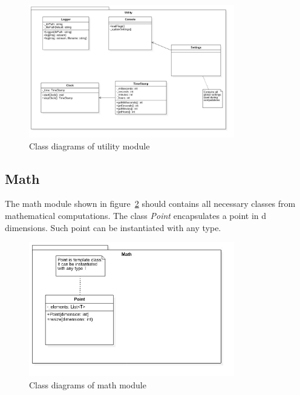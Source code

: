 \documentclass{article}
\begin{document}
%
%
\begin{figure}[H]
	\centering
	\includegraphics[width=0.8\textwidth]{images/utility_class.jpg}
    \caption{Class diagrams of utility module}
    \label{fig:utility_class}
\end{figure}


\newpage
\subsection{Math}

The math module shown in figure~\ref{fig:math_class} should contains all necessary classes from mathematical computations. The class \textit{Point} encapsulates a point in d dimensions. Such point can be instantiated with any type.

%
%
\begin{figure}[H]
	\centering
	\includegraphics[width=0.8\textwidth]{images/math_class.jpg}
    \caption{Class diagrams of math module}
    \label{fig:math_class}
\end{figure}
\end{document}
